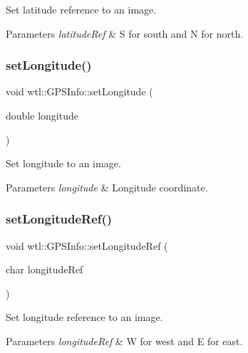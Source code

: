 Set latitude reference to an image. 


\begin{DoxyParams}{Parameters}
{\em latitude\+Ref} & S for south and N for north. \\
\hline
\end{DoxyParams}
\mbox{\label{classwtl_1_1_g_p_s_info_af0e6a11ab111af087a8b58546040db29}} 
\subsubsection{\texorpdfstring{set\+Longitude()}{setLongitude()}}
{\footnotesize\ttfamily void wtl\+::\+G\+P\+S\+Info\+::set\+Longitude (\begin{DoxyParamCaption}\item[{double}]{longitude }\end{DoxyParamCaption})}



Set longitude to an image. 


\begin{DoxyParams}{Parameters}
{\em longitude} & Longitude coordinate. \\
\hline
\end{DoxyParams}
\mbox{\label{classwtl_1_1_g_p_s_info_a011d00aa6a11ac3cf963197ea69e2e79}} 
\subsubsection{\texorpdfstring{set\+Longitude\+Ref()}{setLongitudeRef()}}
{\footnotesize\ttfamily void wtl\+::\+G\+P\+S\+Info\+::set\+Longitude\+Ref (\begin{DoxyParamCaption}\item[{char}]{longitude\+Ref }\end{DoxyParamCaption})}



Set longitude reference to an image. 


\begin{DoxyParams}{Parameters}
{\em longitude\+Ref} & W for west and E for east. \\
\hline
\end{DoxyParams}
\mbox{\label{classwtl_1_1_g_p_s_info_a7b0f3aff5f48c699d33dfc96fbffa14c}} 
